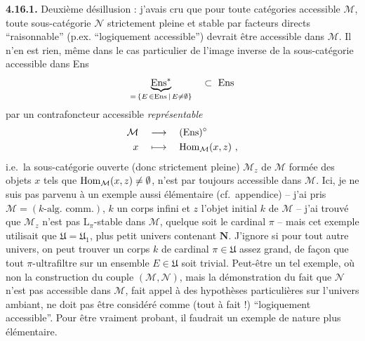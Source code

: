 \textbf{4.16.1.} Deuxième désillusion : j'avais cru que pour toute catégories accessible $\mathcal{M}$, toute %
sous-catégorie $\mathcal{N}$ strictement pleine et stable par facteurs directs “raisonnable” (p.ex. “logiquement accessible”) devrait être accessible dans $\mathcal{M}$. Il n'en est rien, même dans le cas particulier de l'image inverse de la sous-catégorie accessible dans Ens
\[
\underbrace{\mathrm{Ens}^*}_{=\,\{E\,\in\mathrm{Ens}\,\mid\, E\neq\emptyset\}} \quad\subset\ \mathrm{Ens}
\]
par un contrafoncteur accessible \textit{représentable}
\[
\begin{aligned}
\mathcal{M} \quad &\longrightarrow \quad (\mathrm{Ens})^\circ \\
x \quad &\longmapsto \quad \operatorname{Hom}_{\mathcal{M}}(x,z)\ ,
\end{aligned}
\]
i.e.\ la sous-catégorie ouverte (donc strictement pleine) $\mathcal{M}_z$ de $\mathcal{M}$ formée des objets $x$ tels que $\operatorname{Hom}_{\mathcal{M}}(x,z) \neq \emptyset$, n'est par toujours accessible dans $\mathcal{M}$. Ici, je ne suis pas parvenu à %
un exemple aussi élémentaire (cf.\ appendice) -- j'ai pris $\mathcal{M} = (k\text{-alg.\ comm.})$, $k$ un corps infini et $z$ l'objet initial $k$ de $\mathcal{M}$ -- j'ai trouvé que $\mathcal{M}_z$ n'est pas $\mathrm{L}_\pi$-stable dans $\mathcal{M}$, quelque soit le cardinal $\pi$ %
-- mais cet exemple utilisait que $\mathfrak{U} = \mathfrak{U}_1$, plus petit univers contenant $\mathbf{N}$. J'ignore si pour tout autre univers, on peut trouver un corps $k$ de cardinal $\pi \in \mathfrak{U}$ assez grand, de façon que tout $\pi$-ultrafiltre sur un ensemble $E \in \mathfrak{U}$ soit trivial. Peut-être
un tel exemple, où non la construction du couple $(\mathcal{M},\mathcal{N})$, mais la démonstration du fait que $\mathcal{N}$ n'est pas accessible dans $\mathcal{M}$, fait appel à des hypothèses particulières sur l'univers ambiant, ne doit pas être considéré comme (tout à fait !) “logiquement accessible”. Pour être vraiment probant, il faudrait un exemple de nature plus élémentaire.

